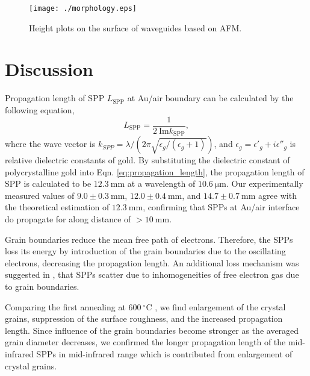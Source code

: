 \documentclass[twocolumn,10.5pt,a4]{article}
\begin{document}
 \begin{figure}[!htbp]
   \begin{center}
    \texttt{[image: ./morphology.eps]}
    \caption{Height plots on the surface of waveguides based on AFM.}
    \label{fig:morphology}
   \end{center}
\end{figure}

\section{Discussion}
\label{sec:discussion}
Propagation length of SPP $L_{\mathrm{SPP}}$ at Au/air boundary can be calculated by the following equation,
\begin{equation}
 L_{\mathrm{SPP}} = \frac{1}{2\:\mathrm{Im} k_{\mathrm{SPP}}},
\label{eq:propagation_length}
 \end{equation}
where the wave vector is $k_{SPP}=\lambda/(2\pi\sqrt{\epsilon_g/(\epsilon_g+1)})$, and $\epsilon_g=\epsilon'_g+i\epsilon''_g$ is relative dielectric constants of gold. 
By substituting the dielectric constant of polycrystalline gold\cite{Palik} into Eqn. \ref{eq:propagation_length}, the propagation length of SPP is calculated to be $12.3\:\mathrm{mm}$ at a wavelength of $10.6\:\mathrm{\mu m}$.
Our experimentally measured values of  $9.0\pm0.3\:\mathrm{mm}$, $12.0\pm0.4\:\mathrm{mm}$, and $14.7\pm0.7\:\mathrm{mm}$ agree with the theoretical estimation of $12.3\:\mathrm{mm}$, confirming that SPPs at Au/air interface do propagate for along distance of $>10\:\mathrm{mm}$.

Grain boundaries reduce the mean free path of electrons\cite{Jens}. Therefore, the SPPs loss its energy by introduction of the grain boundaries due to the oscillating electrons, decreasing the propagation length. 
An additional loss mechanism was suggested in \cite{Kuttge}, that SPPs scatter due to inhomogeneities of free electron gas due to grain boundaries. 

Comparing the first annealing at $600\:^\circ\mathrm{C}$ , we find enlargement of the crystal grains, suppression of the surface roughness, and the increased propagation length. Since influence of the grain boundaries become stronger as the averaged grain diameter decreases, we confirmed the longer propagation length of the mid-infrared SPPs in mid-infrared range which is contributed from enlargement of crystal grains.
\end{document}
